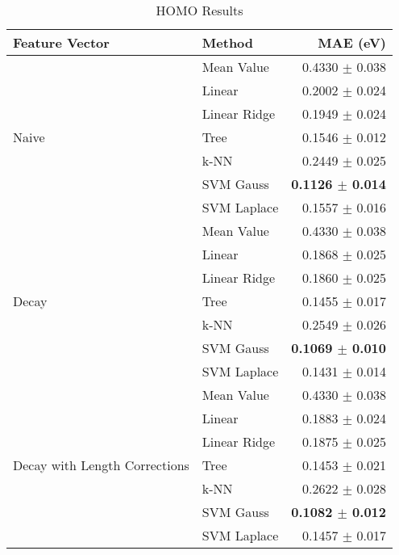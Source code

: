 \documentclass[10pt]{article}
\begin{document}
\begin{table}[H]
  \centering
  \caption{HOMO Results}
  \begin{tabular}{llr}
            Feature Vector     & Method       & MAE (eV)                \\
    \hline\hline
    \multirow{7}{*}{Naive} & Mean Value   & 0.4330 $\pm$ 0.038 \\
                               & Linear       & 0.2002 $\pm$ 0.024 \\
                               & Linear Ridge & 0.1949 $\pm$ 0.024 \\
                               & Tree         & 0.1546 $\pm$ 0.012 \\
                               & k-NN         & 0.2449 $\pm$ 0.025 \\
                               & SVM Gauss    & \textbf{0.1126 $\pm$ 0.014} \\
                               & SVM Laplace  & 0.1557 $\pm$ 0.016 \\
    \hline
    \multirow{7}{*}{Decay}     & Mean Value   & 0.4330 $\pm$ 0.038 \\
                               & Linear       & 0.1868 $\pm$ 0.025 \\
                               & Linear Ridge & 0.1860 $\pm$ 0.025 \\
                               & Tree         & 0.1455 $\pm$ 0.017 \\
                               & k-NN         & 0.2549 $\pm$ 0.026 \\
                               & SVM Gauss    & \textbf{0.1069 $\pm$ 0.010} \\
                               & SVM Laplace  & 0.1431 $\pm$ 0.014 \\
    \hline
    \multirow{7}{*}{Decay with Length Corrections} & Mean Value   & 0.4330 $\pm$ 0.038 \\
                               & Linear       & 0.1883 $\pm$ 0.024 \\
                               & Linear Ridge & 0.1875 $\pm$ 0.025 \\
                               & Tree         & 0.1453 $\pm$ 0.021 \\
                               & k-NN         & 0.2622 $\pm$ 0.028 \\
                               & SVM Gauss    & \textbf{0.1082 $\pm$ 0.012} \\
                               & SVM Laplace  & 0.1457 $\pm$ 0.017 \\

\end{tabular}
\end{table}
\end{document}
